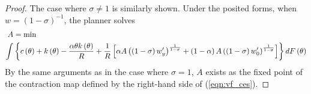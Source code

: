 \documentclass[11pt]{article}
\begin{document}
\begin{proof}
    The case where \( \sigma\ne 1 \) is similarly shown. Under the posited forms, when \( w = \left( 1-\sigma \right)^{-1} \), the planner solves 
    \begin{align}
        A&=\text{\ensuremath{\min}} \notag \\
        \int&\left\{ c\left(\theta\right)+k\left(\theta\right)-\frac{\alpha\theta k\left(\theta\right)}{R}+\frac{1}{R}\left[\alpha A\left(\left(1-\sigma\right)w_{y}^{\prime}\right)^{\frac{1}{1-\sigma}}+\left(1-\alpha\right)A\left(\left(1-\sigma\right)w_{0}^{\prime}\right)^{\frac{1}{1-\sigma}}\right]\right\} dF\left(\theta\right) \label{eqn:vf_ces}
    \end{align}
    By the same arguments as in the case where \( \sigma = 1 \), \( A \) exists as the fixed point of the contraction map defined by the right-hand side of (\ref{eqn:vf_ces}). 
\end{proof}
\end{document}
